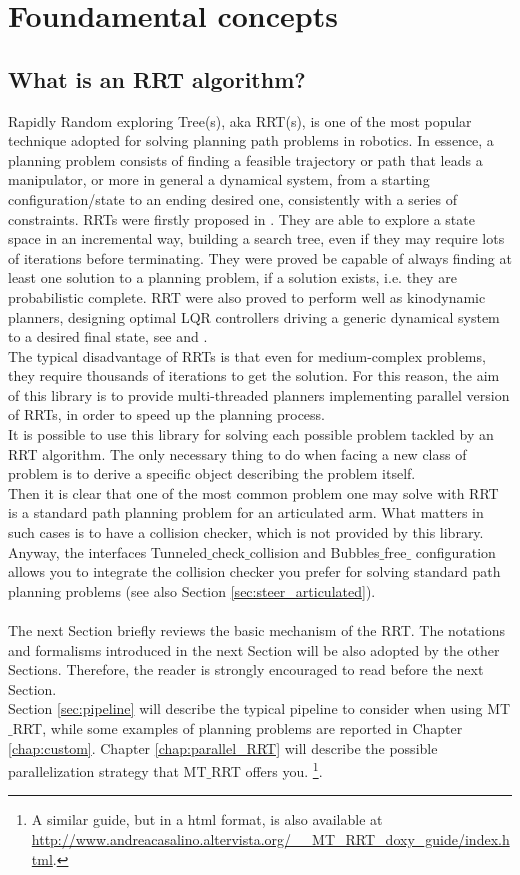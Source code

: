 \chapter{Foundamental concepts}

\section{What is an RRT algorithm?}

Rapidly Random exploring Tree(s), aka RRT(s), is one of the most popular technique adopted for solving planning path problems in robotics.
In essence, a planning problem consists of finding a feasible trajectory or path that leads a manipulator, or more in general a dynamical system, from a starting configuration/state to an ending desired one, consistently with a series of constraints.
RRTs were firstly proposed in \cite{RRT_LaValle}. They are able to explore a state space in an incremental way, building a search tree, even if they may require lots of iterations before terminating. They were proved be capable of always finding at least one solution to a planning problem, if a solution exists, i.e. they are probabilistic complete.
RRT were also proved to perform well as kinodynamic planners, designing optimal LQR controllers driving a generic dynamical system to a desired final state, see \cite{LQR_RRT_01} and  \cite{LQR_RRT_02}.
\\
The typical disadvantage of RRTs is that even for medium-complex problems, they require thousands of iterations to get the solution. 
For this reason, the aim of this library is to provide multi-threaded planners implementing parallel version of RRTs, in order to speed up the planning process. 
\\
It is possible to use this library for solving each possible problem tackled by an RRT algorithm. The only necessary thing to do when facing a new class of problem is to derive a specific object describing the problem itself. 
\\
Then it is clear that one of the most common problem one may solve with RRT is a standard path planning problem for an articulated arm.
What matters in such cases is to have a collision checker, which is not provided by this library. Anyway, the interfaces Tunneled$\_$check$\_$collision and Bubbles$\_$free$\_$ configuration allows you to integrate the collision checker you prefer for solving standard path planning problems (see also Section \ref{sec:steer_articulated}).
\\
\\
The next Section briefly reviews the basic mechanism of the RRT. The notations and formalisms introduced in the next Section will be also adopted by the other Sections. Therefore, the reader is strongly encouraged to read before the next Section.
\\
Section \ref{sec:pipeline} will describe the typical pipeline to consider when using MT$\_$RRT, while some examples of planning problems are reported in Chapter \ref{chap:custom}. Chapter \ref{chap:parallel_RRT} will describe the possible parallelization strategy that MT$\_$RRT offers you.
\footnote{A similar guide, but in a html format, is also available at \url{http://www.andreacasalino.altervista.org/__MT_RRT_doxy_guide/index.html}.}.

